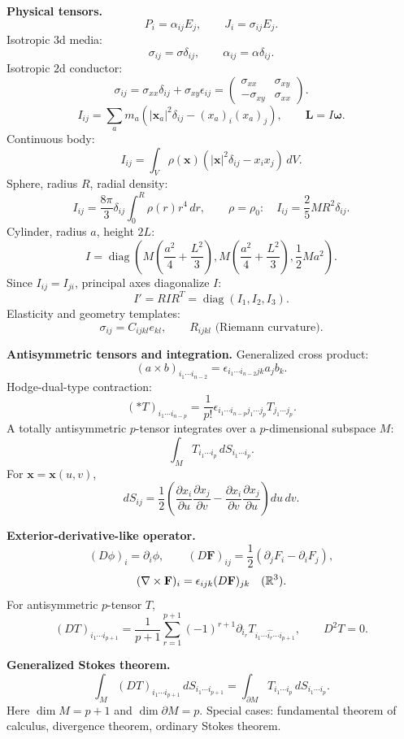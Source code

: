 \noindent\textbf{Physical tensors.}
\[
P_i=\alpha_{ij}E_j,\qquad J_i=\sigma_{ij}E_j.
\]
Isotropic $3$d media:
\[
\sigma_{ij}=\sigma\delta_{ij},\qquad
\alpha_{ij}=\alpha\delta_{ij}.
\]
Isotropic $2$d conductor:
\[
\sigma_{ij}=\sigma_{xx}\delta_{ij}+\sigma_{xy}\epsilon_{ij}
=\begin{pmatrix}
\sigma_{xx} & \sigma_{xy}\\
-\sigma_{xy} & \sigma_{xx}
\end{pmatrix}.
\]
\[
I_{ij}=\sum_a m_a\left(|\mathbf{x}_a|^2\delta_{ij}
-(x_a)_i(x_a)_j\right),\qquad \mathbf{L}=I\bm{\omega}.
\]
Continuous body:
\[
\boxed{I_{ij}=\int_V\rho(\mathbf{x})
\left(|\mathbf{x}|^2\delta_{ij}-x_ix_j\right)\,dV.}
\]
Sphere, radius $R$, radial density:
\[
I_{ij}=\frac{8\pi}{3}\delta_{ij}\int_0^R\rho(r)r^4\,dr,
\qquad
\rho=\rho_0:\quad I_{ij}=\frac25MR^2\delta_{ij}.
\]
Cylinder, radius $a$, height $2L$:
\[
I=\operatorname{diag}\left(
M\left(\frac{a^2}{4}+\frac{L^2}{3}\right),
M\left(\frac{a^2}{4}+\frac{L^2}{3}\right),
\frac12Ma^2\right).
\]
Since $I_{ij}=I_{ji}$, principal axes diagonalize $I$:
\[
I'=RIR^T=\operatorname{diag}(I_1,I_2,I_3).
\]
Elasticity and geometry templates:
\[
\sigma_{ij}=C_{ijkl}e_{kl},\qquad R_{ijkl}\text{ (Riemann curvature)}.
\]

\noindent\textbf{Antisymmetric tensors and integration.}
Generalized cross product:
\[
(a\times b)_{i_1\cdots i_{n-2}}
=\epsilon_{i_1\cdots i_{n-2}jk}a_jb_k.
\]
Hodge-dual-type contraction:
\[
(*T)_{i_1\cdots i_{n-p}}
=\frac1{p!}\epsilon_{i_1\cdots i_{n-p}j_1\cdots j_p}
T_{j_1\cdots j_p}.
\]
A totally antisymmetric $p$-tensor integrates over a $p$-dimensional subspace $M$:
\[
\int_M T_{i_1\cdots i_p}\,dS_{i_1\cdots i_p}.
\]
For $\mathbf{x}=\mathbf{x}(u,v)$,
\[
dS_{ij}
=\frac12\left(
\frac{\partial x_i}{\partial u}\frac{\partial x_j}{\partial v}
-\frac{\partial x_i}{\partial v}\frac{\partial x_j}{\partial u}
\right)du\,dv.
\]

\noindent\textbf{Exterior-derivative-like operator.}
\[
(D\phi)_i=\partial_i\phi,\qquad
(D\mathbf{F})_{ij}=\frac12(\partial_jF_i-\partial_iF_j),
\]
\[
(\nabla\times\mathbf{F})_i
=\epsilon_{ijk}(D\mathbf{F})_{jk}\quad(\mathbb{R}^3).
\]
For antisymmetric $p$-tensor $T$,
\[
(DT)_{i_1\cdots i_{p+1}}
=\frac1{p+1}\sum_{r=1}^{p+1}(-1)^{r+1}
\partial_{i_r}T_{i_1\cdots\widehat{i_r}\cdots i_{p+1}},
\qquad
D^2T=0.
\]

\noindent\textbf{Generalized Stokes theorem.}
\[
\boxed{\int_M(DT)_{i_1\cdots i_{p+1}}\,dS_{i_1\cdots i_{p+1}}
=\int_{\partial M}T_{i_1\cdots i_p}\,dS_{i_1\cdots i_p}.}
\]
Here $\dim M=p+1$ and $\dim\partial M=p$. Special cases: fundamental theorem of
calculus, divergence theorem, ordinary Stokes theorem.
